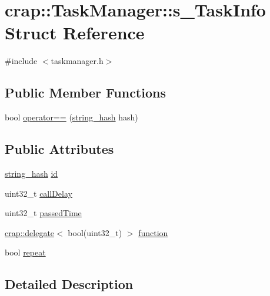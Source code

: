 \hypertarget{structcrap_1_1_task_manager_1_1s___task_info}{}\section{crap\+:\+:Task\+Manager\+:\+:s\+\_\+\+Task\+Info Struct Reference}
\label{structcrap_1_1_task_manager_1_1s___task_info}


{\ttfamily \#include $<$taskmanager.\+h$>$}

\subsection*{Public Member Functions}
\begin{DoxyCompactItemize}
\item 
bool \hyperlink{structcrap_1_1_task_manager_1_1s___task_info_a48c390fd392ca334c847cbd38204793a}{operator==} (\hyperlink{classcrap_1_1string__hash}{string\+\_\+hash} hash)
\end{DoxyCompactItemize}
\subsection*{Public Attributes}
\begin{DoxyCompactItemize}
\item 
\hyperlink{classcrap_1_1string__hash}{string\+\_\+hash} \hyperlink{structcrap_1_1_task_manager_1_1s___task_info_a5287e8ec5a4f307ba815ec41f05ba674}{id}
\item 
uint32\+\_\+t \hyperlink{structcrap_1_1_task_manager_1_1s___task_info_a8fe487170a9eccaffeed54ac7e80d800}{call\+Delay}
\item 
uint32\+\_\+t \hyperlink{structcrap_1_1_task_manager_1_1s___task_info_aeb218208ca06a73ac808eefb1b151a65}{passed\+Time}
\item 
\hyperlink{classcrap_1_1delegate}{crap\+::delegate}$<$ bool(uint32\+\_\+t) $>$ \hyperlink{structcrap_1_1_task_manager_1_1s___task_info_a4361477d8a4d9eef935f84980989a1f5}{function}
\item 
bool \hyperlink{structcrap_1_1_task_manager_1_1s___task_info_a3e51e99cb4edbd871cda5562d8814b42}{repeat}
\end{DoxyCompactItemize}


\subsection{Detailed Description}


